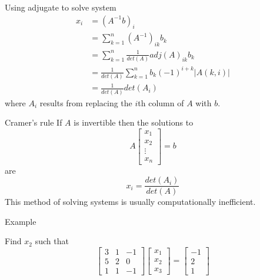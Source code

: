 \documentclass{beamer}
\begin{document}
\begin{frame}{Using adjugate to solve system}
  \begin{align*}
    x_i &= (A^{-1}b)_{i}\\
        &= \sum_{k=1}^n(A^{-1})_{ik}b_k\\
        &= \sum_{k=1}^n\frac{1}{det(A)}adj(A)_{ik}b_k\\
        &= \frac{1}{det(A)}\sum_{k=1}^nb_k(-1)^{i+k}\left|A(k, i)\right|\\
        &= \frac{1}{det(A)}det(A_i)
  \end{align*}
  where $A_i$ results from replacing the $i$th column of $A$ with $b$.
\end{frame}

\begin{frame}{Cramer's rule}
  If $A$ is invertible then the solutions to
  \begin{equation*}
    A \left[
      \begin{array}{c}
        x_1\\
        x_2\\
        \vdots\\
        x_n
      \end{array}
    \right] = b
  \end{equation*}
  are
  \begin{equation*}
    x_i = \frac{det(A_i)}{det(A)}
  \end{equation*}
  This method of solving systems is usually computationally inefficient.
\end{frame}

\begin{frame}{Example}
  \begin{example}
    Find $x_2$ such that
    \begin{equation*}
      \left[
	\begin{array}{ccc}
          3&1&-1\\
          5&2&0\\
          1&1&-1
	\end{array}
      \right]
      \left[
          \begin{array}{c}
            x_1\\
            x_2\\
            x_3
          \end{array}
        \right]=
        \left[
          \begin{array}{c}
            -1\\
            2\\
            1
          \end{array}
        \right]
    \end{equation*}
  \end{example}
\end{frame}
\end{document}
